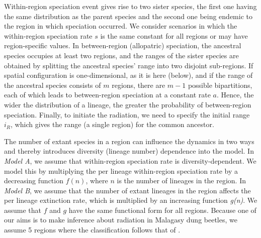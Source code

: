 Within-region speciation event gives rise to two sister species, the first one having the same distribution as the parent species and the second one being endemic to the region in which speciation occurred. 
We consider scenarios in which the within-region speciation rate $s$ is the same constant for all regions or may have region-specific values. 
In between-region (allopatric) speciation, the ancestral species occupies at least two regions, and the ranges of the sister species are obtained by splitting the ancestral species’ range into two disjoint sub-regions. 
If spatial configuration is one-dimensional, as it is here (below), and if the range of the ancestral species consists of $m$ regions, there are $m-1$ possible bipartitions, each of which leads to between-region speciation at a constant rate $a$. 
Hence, the wider the distribution of a lineage, the greater the probability of between-region speciation. 
Finally, to initiate the radiation, we need to specify the initial range $i_R$, which gives the range (a single region) for the common ancestor.
 
The number of extant species in a region can influence the dynamics in two ways and thereby introduces diversity (lineage number) dependence into the model. 
In \textit{Model A}, we assume that within-region speciation rate is diversity-dependent. 
We model this by multiplying the per lineage within-region speciation rate by a decreasing function $f(n)$, where $n$ is the number of lineages in the region. 
In \textit{Model B}, we assume that the number of extant lineages in the region affects the per lineage extinction rate, which is multiplied by an increasing function \textit{g(n)}. 
We assume that $f$ and $g$ have the same functional form for all regions. 
Because one of our aims is to make inference about radiation in Malagasy dung beetles, we assume 5 regions where the classification follows that of  \citep{Miraldo2014}.

